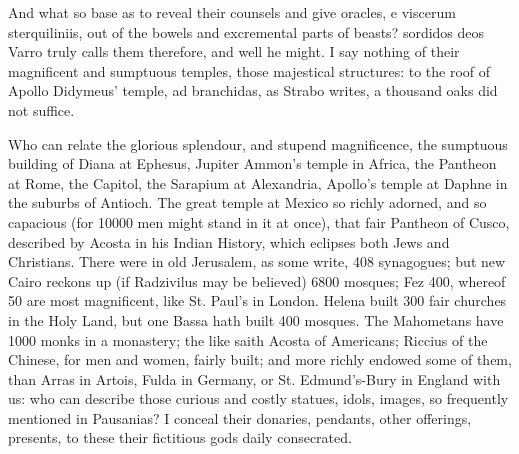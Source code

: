 {And what so base as to reveal their counsels and give oracles, e
viscerum sterquiliniis, out of the bowels and excremental parts of
beasts? sordidos deos Varro truly calls them therefore, and well he
might. I say nothing of their magnificent and sumptuous temples, those
majestical structures: to the roof of Apollo Didymeus' temple, ad
branchidas, as Strabo writes, a thousand oaks did not suffice.

Who can relate the glorious splendour, and stupend magnificence, the
sumptuous building of Diana at Ephesus, Jupiter Ammon's temple in
Africa, the Pantheon at Rome, the Capitol, the Sarapium at Alexandria,
Apollo's temple at Daphne in the suburbs of Antioch. The great temple
at Mexico so richly adorned, and so capacious (for 10\thinspace{}000 men might
stand in it at once), that fair Pantheon of Cusco, described by Acosta
in his Indian History, which eclipses both Jews and Christians. There
were in old Jerusalem, as some write, 408 synagogues; but new Cairo
reckons up (if Radzivilus may be believed) 6800 mosques; Fez 400,
whereof 50 are most magnificent, like St. Paul's in London. Helena
built 300 fair churches in the Holy Land, but one Bassa hath built 400
mosques. The Mahometans have 1000 monks in a monastery; the like saith
Acosta of Americans; Riccius of the Chinese, for men and women, fairly
built; and more richly endowed some of them, than Arras in Artois,
Fulda in Germany, or St. Edmund's-Bury in England with us: who can
describe those curious and costly statues, idols, images, so frequently
mentioned in Pausanias? I conceal their donaries, pendants, other
offerings, presents, to these their fictitious gods daily consecrated.

}
